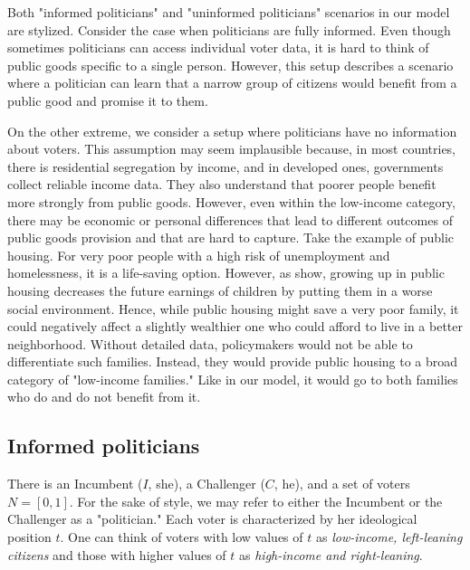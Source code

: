 \documentclass[12pt,english]{article}
\begin{document}
Both "informed politicians" and "uninformed politicians" scenarios in our model are stylized. Consider the case when politicians are fully informed. Even though sometimes politicians can access individual voter data, it is hard to think of public goods specific to a single person. However, this setup describes a scenario where a politician can learn that a narrow group of citizens would benefit from a public good and promise it to them. 

On the other extreme, we consider a setup where politicians have no information about voters. This assumption may seem implausible because, in most countries, there is residential segregation by income, and in developed ones, governments collect reliable income data. They also understand that poorer people benefit more strongly from public goods. However, even within the low-income category, there may be economic or personal differences that lead to different outcomes of public goods provision and that are hard to capture. Take the example of public housing. For very poor people with a high risk of unemployment and homelessness, it is a life-saving option. However, as \cite{chetty2016effects} show, growing up in public housing decreases the future earnings of children by putting them in a worse social environment. Hence, while public housing might save a very poor family, it could negatively affect a slightly wealthier one who could afford to live in a better neighborhood. Without detailed data, policymakers would not be able to differentiate such families. Instead, they would provide public housing to a broad category of "low-income families." Like in our model, it would go to both families who do and do not benefit from it. 

 





\subsection{Informed politicians} 

There is an Incumbent ($I$, she), a Challenger ($C$, he), and a set of voters $N = [0,1]$. For the sake of style, we may refer to either the Incumbent or the Challenger as a "politician." Each voter is characterized by her ideological position $t$. One can think of voters with low values of $t$ as \emph{low-income, left-leaning citizens} and those with higher values of $t$ as \emph{high-income and right-leaning}. 
\end{document}
